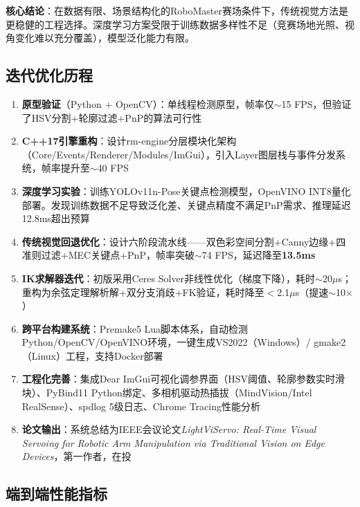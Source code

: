 \documentclass[12pt,a4paper]{ctexart}
\begin{document}
\textbf{核心结论}：在数据有限、场景结构化的RoboMaster赛场条件下，传统视觉方法是更稳健的工程选择。深度学习方案受限于训练数据多样性不足（竞赛场地光照、视角变化难以充分覆盖），模型泛化能力有限。

\subsection{迭代优化历程}

\begin{iterbox}[版本迭代]
\begin{enumerate}[label=\textbf{V\arabic*}:, leftmargin=3em]
    \item \textbf{原型验证}（Python + OpenCV）：单线程检测原型，帧率仅$\sim$15 FPS，但验证了HSV分割+轮廓过滤+PnP的算法可行性
    \item \textbf{C++17引擎重构}：设计rm-engine分层模块化架构（Core/Events/Renderer/Modules/ImGui），引入Layer图层栈与事件分发系统，帧率提升至$\sim$40 FPS
    \item \textbf{深度学习实验}：训练YOLOv11n-Pose关键点检测模型，OpenVINO INT8量化部署。发现训练数据不足导致泛化差、关键点精度不满足PnP需求、推理延迟12.8ms超出预算
    \item \textbf{传统视觉回退优化}：设计六阶段流水线——双色彩空间分割+Canny边缘+四准则过滤+MEC关键点+PnP，帧率突破$\sim$74 FPS，延迟降至\textbf{13.5ms}
    \item \textbf{IK求解器迭代}：初版采用Ceres Solver非线性优化（梯度下降），耗时$\sim$20$\mu$s；重构为余弦定理解析解+双分支消歧+FK验证，耗时降至$<$2.1$\mu$s（提速$\sim$10$\times$）
    \item \textbf{跨平台构建系统}：Premake5 Lua脚本体系，自动检测Python/OpenCV/OpenVINO环境，一键生成VS2022（Windows）/ gmake2（Linux）工程，支持Docker部署
    \item \textbf{工程化完善}：集成Dear ImGui可视化调参界面（HSV阈值、轮廓参数实时滑块）、PyBind11 Python绑定、多相机驱动热插拔（MindVision/Intel RealSense）、spdlog 5级日志、Chrome Tracing性能分析
    \item \textbf{论文输出}：系统总结为IEEE会议论文\textit{LightViServo: Real-Time Visual Servoing for Robotic Arm Manipulation via Traditional Vision on Edge Devices}，第一作者，在投
\end{enumerate}
\end{iterbox}

\subsection{端到端性能指标}
\end{document}
